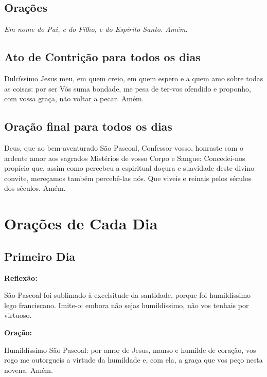 \documentclass[18pt]{article}
\begin{document}
\begin{justify}
\begin{center}
\section{Orações}\label{sec:Orações}
\textit{Em nome do Pai, e do Filho, e do Espírito Santo. Amém.}
\end{center}

\subsection*{Ato de Contrição para todos os dias}
Dulcíssimo Jesus meu, em quem creio, em quem espero e a quem amo sobre todas as coisas: por ser Vós suma bondade, me pesa de ter-vos ofendido e proponho, com vossa graça, não voltar a pecar. Amém.

\subsection*{Oração final para todos os dias}
Deus, que ao bem-aventurado São Pascoal, Confessor vosso, honraste com o ardente amor aos sagrados Mistérios de vosso Corpo e Sangue: Concedei-nos propício que, assim como percebeu a espiritual doçura e suavidade deste divino convite, mereçamos também percebê-las nós. Que viveis e reinais pelos séculos dos séculos. Amém.

\vfill
\end{justify}


\newpage

\section*{Orações de Cada Dia}

\subsection*{Primeiro Dia}
\textbf{Reflexão:}

São Pascoal foi sublimado à excelsitude da santidade, porque foi humildíssimo lego franciscano. Imite-o: embora não sejas humildíssimo, não vos tenhais por virtuoso.

\textbf{Oração:}

Humildíssimo São Pascoal: por amor de Jesus, manso e humilde de coração, vos rogo me outorgueis a virtude da humildade e, com ela, a graça que vos peço nesta novena. Amém.
\end{document}
